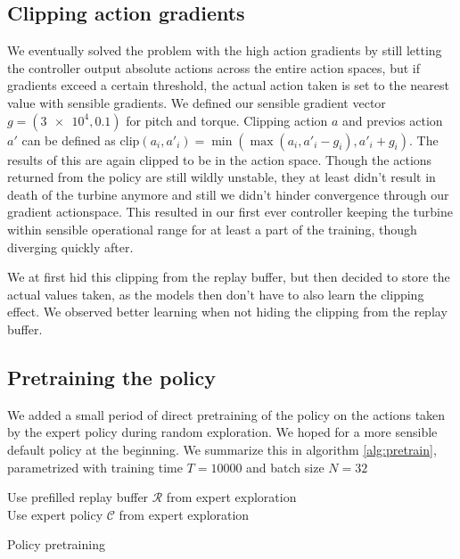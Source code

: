 \documentclass[hyperref,beleg]{cgvpub}
\begin{document}
\subsection{Clipping action gradients}
\label{sec:clip_act_grad}
We eventually solved the problem with the high action gradients by still letting the controller output absolute actions across the entire action spaces, but if gradients exceed a certain threshold, the actual action taken is set to the nearest value with sensible gradients. We defined our sensible gradient vector $g = (\num{3e4}, 0.1)$ for pitch and torque. Clipping action $a$ and previos action $a'$ can be defined as $\mathrm{clip}(a_i, a'_i) = \min(\max(a_i, a'_i -g_i), a'_i + g_i)$. The results of this are again clipped to be in the action space. Though the actions returned from the policy are still wildly unstable, they at least didn't result in death of the turbine anymore and still we didn't hinder convergence through our gradient actionspace. This resulted in our first ever controller keeping the turbine within sensible operational range for at least a part of the training, though diverging quickly after.

We at first hid this clipping from the replay buffer, but then decided to store the actual values taken, as the models then don't have to also learn the clipping effect. We observed better learning when not hiding the clipping from the replay buffer.

\subsection{Pretraining the policy}
\label{sec:pretrain}

We added a small period of direct pretraining of the policy on the actions taken by the expert policy during random exploration. We hoped for a more sensible default policy at the beginning. We summarize this in algorithm \ref{alg:pretrain}, parametrized with training time $T=10000$ and batch size $N=32$

\begin{algorithm}
\SetAlgoLined
Use prefilled replay buffer $\mathcal{R}$ from expert exploration\\
Use expert policy $\mathcal{C}$ from expert exploration\\
\caption{Policy pretraining}
\label{alg:pretrain}
\end{algorithm}
\end{document}
